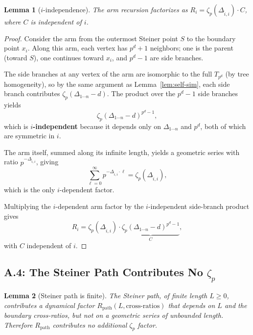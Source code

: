 \documentclass[11pt,a4paper]{article}
\newtheorem{lemma}{Lemma}
\begin{document}
\begin{lemma}[$i$-independence]
\label{lem:i-indep}
The arm recursion factorizes as $R_i = \zeta_p(\Delta_{\hat{i},i}) \cdot C$, where $C$ is independent of $i$.
\end{lemma}

\begin{proof}
Consider the arm from the outermost Steiner point $S$ to the boundary point $x_i$. Along this arm, each vertex has $p^d{+}1$ neighbors; one is the parent (toward $S$), one continues toward $x_i$, and $p^d - 1$ are side branches.

The side branches at any vertex of the arm are isomorphic to the full $T_{p^d}$ (by tree homogeneity), so by the same argument as Lemma~\ref{lem:self-sim}, each side branch contributes $\zeta_p(\Delta_{1\cdots n} - d)$. The product over the $p^d - 1$ side branches yields
\begin{equation}
\zeta_p(\Delta_{1\cdots n} - d)^{p^d - 1},
\end{equation}
which is \textbf{$i$-independent} because it depends only on $\Delta_{1\cdots n}$ and $p^d$, both of which are symmetric in $i$.

The arm itself, summed along its infinite length, yields a geometric series with ratio $p^{-\Delta_{\hat{i},i}}$, giving
\begin{equation}
\sum_{\ell=0}^\infty p^{-\Delta_{\hat{i},i} \cdot \ell} = \zeta_p(\Delta_{\hat{i},i}),
\end{equation}
which is the only $i$-dependent factor.

Multiplying the $i$-dependent arm factor by the $i$-independent side-branch product gives
\begin{equation}
R_i = \zeta_p(\Delta_{\hat{i},i}) \cdot \underbrace{\zeta_p(\Delta_{1\cdots n} - d)^{p^d - 1}}_{C},
\end{equation}
with $C$ independent of $i$. \qedhere
\end{proof}

\subsection{A.4: The Steiner Path Contributes No $\zeta_p$}

\begin{lemma}[Steiner path is finite]
\label{lem:path}
The Steiner path, of finite length $L \geq 0$, contributes a dynamical factor $R_{\mathrm{path}}(L, \text{cross-ratios})$ that depends on $L$ and the boundary cross-ratios, but \emph{not} on a geometric series of unbounded length. Therefore $R_{\mathrm{path}}$ contributes no additional $\zeta_p$ factor.
\end{lemma}
\end{document}

